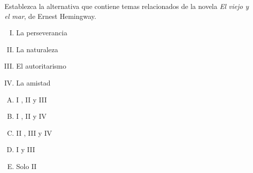 Establezca la alternativa que contiene temas relacionados de la novela \textit{El viejo y el mar}, de Ernest Hemingway.
\begin{enumerate}[I.]
	\item La perseverancia
	\item La naturaleza
	\item El autoritarismo
	\item La amistad
\end{enumerate}

\begin{enumerate}[A)]
	\item I , II y III
	\item I , II y IV
	\item II , III y IV
	\item I y III
	\item Solo II
\end{enumerate}